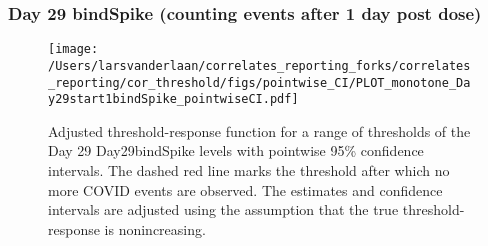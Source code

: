 \documentclass[]{article}
\begin{document}
\clearpage
\clearpage

\clearpage

\hypertarget{day-29-bindspike-counting-events-after-1-day-post-dose}{%
\subsubsection{Day 29 bindSpike (counting events after 1 day post
dose)}\label{day-29-bindspike-counting-events-after-1-day-post-dose}}

\begin{figure}[H]
\centering
\texttt{[image: /Users/larsvanderlaan/correlates\_reporting\_forks/correlates\_reporting/cor\_threshold/figs/pointwise\_CI/PLOT\_monotone\_Day29start1bindSpike\_pointwiseCI.pdf]}
\caption{Adjusted threshold-response function for a range of thresholds of the
  Day 29 Day29bindSpike levels with pointwise 95\% confidence intervals. The dashed red line marks the threshold after which no more COVID events are observed. The estimates and confidence intervals are adjusted using the assumption that the true threshold-response is nonincreasing.}
\end{figure}
\end{document}
